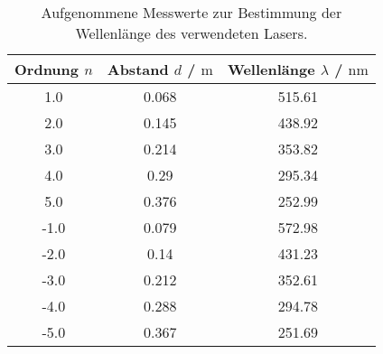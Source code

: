\begin{table}
\centering
\caption{Aufgenommene Messwerte zur Bestimmung der Wellenlänge des verwendeten Lasers.}

\begin{tabular}{ccc}
\toprule
Ordnung $n$ & Abstand $d$ / $\si{\meter}$ & Wellenlänge $\lambda$ / $\si{\nano\meter}$ \\
\midrule
1.0 & 0.068 & 515.61 \\
2.0 & 0.145 & 438.92 \\
3.0 & 0.214 & 353.82 \\
4.0 & 0.29 & 295.34 \\
5.0 & 0.376 & 252.99 \\
-1.0 & 0.079 & 572.98 \\
-2.0 & 0.14 & 431.23 \\
-3.0 & 0.212 & 352.61 \\
-4.0 & 0.288 & 294.78 \\
-5.0 & 0.367 & 251.69 \\
\bottomrule
\end{tabular}
\label{tab:welle}
\end{table}
